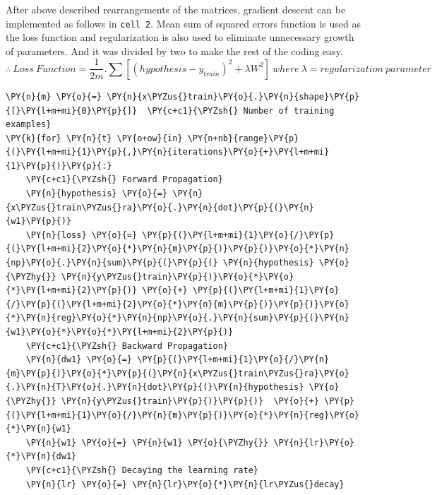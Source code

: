 \documentclass[a4paper,11pt]{article}%
\begin{document}
After above described rearrangements of the matrices, gradient descent can be implemented as follows in {\tt cell 2}. Mean sum of squared errors function is used as the loss function and regularization is also used to eliminate unnecessary growth of parameters. And it was divided by two to make the rest of the coding easy. 
{ \scriptsize\[
\therefore ~ Loss~ Function = \frac{1}{2m}.\sum\left[ \left( hypothesis - y_{train}\right)^2 + \lambda W^2 \right]~ where~\lambda = regularization~parameter
\]}

    \begin{tcolorbox}[breakable, size=fbox, boxrule=1pt, pad at break*=1mm,colback=cellbackground, colframe=cellborder]
\begin{Verbatim}[commandchars=\\\{\}]
\PY{n}{m} \PY{o}{=} \PY{n}{x\PYZus{}train}\PY{o}{.}\PY{n}{shape}\PY{p}{[}\PY{l+m+mi}{0}\PY{p}{]}  \PY{c+c1}{\PYZsh{} Number of training examples}
\PY{k}{for} \PY{n}{t} \PY{o+ow}{in} \PY{n+nb}{range}\PY{p}{(}\PY{l+m+mi}{1}\PY{p}{,}\PY{n}{iterations}\PY{o}{+}\PY{l+m+mi}{1}\PY{p}{)}\PY{p}{:}    
    \PY{c+c1}{\PYZsh{} Forward Propagation}
    \PY{n}{hypothesis} \PY{o}{=} \PY{n}{x\PYZus{}train\PYZus{}ra}\PY{o}{.}\PY{n}{dot}\PY{p}{(}\PY{n}{w1}\PY{p}{)}
    \PY{n}{loss} \PY{o}{=} \PY{p}{(}\PY{l+m+mi}{1}\PY{o}{/}\PY{p}{(}\PY{l+m+mi}{2}\PY{o}{*}\PY{n}{m}\PY{p}{)}\PY{p}{)}\PY{o}{*}\PY{n}{np}\PY{o}{.}\PY{n}{sum}\PY{p}{(}\PY{p}{(} \PY{n}{hypothesis} \PY{o}{\PYZhy{}} \PY{n}{y\PYZus{}train}\PY{p}{)}\PY{o}{*}\PY{o}{*}\PY{l+m+mi}{2}\PY{p}{)} \PY{o}{+} \PY{p}{(}\PY{l+m+mi}{1}\PY{o}{/}\PY{p}{(}\PY{l+m+mi}{2}\PY{o}{*}\PY{n}{m}\PY{p}{)}\PY{p}{)}\PY{o}{*}\PY{n}{reg}\PY{o}{*}\PY{n}{np}\PY{o}{.}\PY{n}{sum}\PY{p}{(}\PY{n}{w1}\PY{o}{*}\PY{o}{*}\PY{l+m+mi}{2}\PY{p}{)}   
    \PY{c+c1}{\PYZsh{} Backward Propagation}
    \PY{n}{dw1} \PY{o}{=} \PY{p}{(}\PY{l+m+mi}{1}\PY{o}{/}\PY{n}{m}\PY{p}{)}\PY{o}{*}\PY{p}{(}\PY{n}{x\PYZus{}train\PYZus{}ra}\PY{o}{.}\PY{n}{T}\PY{o}{.}\PY{n}{dot}\PY{p}{(}\PY{n}{hypothesis} \PY{o}{\PYZhy{}} \PY{n}{y\PYZus{}train}\PY{p}{)}\PY{p}{)}  \PY{o}{+} \PY{p}{(}\PY{l+m+mi}{1}\PY{o}{/}\PY{n}{m}\PY{p}{)}\PY{o}{*}\PY{n}{reg}\PY{o}{*}\PY{n}{w1} 
    \PY{n}{w1} \PY{o}{=} \PY{n}{w1} \PY{o}{\PYZhy{}} \PY{n}{lr}\PY{o}{*}\PY{n}{dw1}    
    \PY{c+c1}{\PYZsh{} Decaying the learning rate}
    \PY{n}{lr} \PY{o}{=} \PY{n}{lr}\PY{o}{*}\PY{n}{lr\PYZus{}decay}
\end{Verbatim}
\end{tcolorbox}
\end{document}
